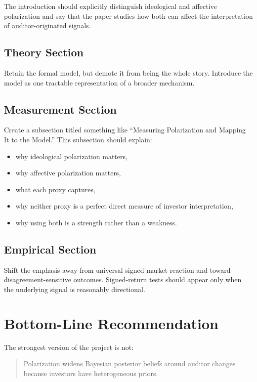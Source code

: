 \documentclass[12pt]{article}
\begin{document}
The introduction should explicitly distinguish ideological and affective polarization and say that the paper studies how both can affect the interpretation of auditor-originated signals.

\subsection{Theory Section}

Retain the formal model, but demote it from being the whole story. Introduce the model as one tractable representation of a broader mechanism.

\subsection{Measurement Section}

Create a subsection titled something like ``Measuring Polarization and Mapping It to the Model.'' This subsection should explain:

\begin{itemize}
    \item why ideological polarization matters,
    \item why affective polarization matters,
    \item what each proxy captures,
    \item why neither proxy is a perfect direct measure of investor interpretation,
    \item why using both is a strength rather than a weakness.
\end{itemize}

\subsection{Empirical Section}

Shift the emphasis away from universal signed market reaction and toward disagreement-sensitive outcomes. Signed-return tests should appear only when the underlying signal is reasonably directional.

\section{Bottom-Line Recommendation}

The strongest version of the project is not:

\begin{quote}
Polarization widens Bayesian posterior beliefs around auditor changes because investors have heterogeneous priors.
\end{quote}
\end{document}
